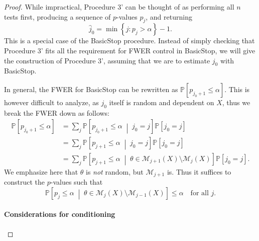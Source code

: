 \documentclass[aos, authoryear]{imsart}
\theoremstyle{definition}
\theoremstyle{custom}
\newcommand{\PP}{\mathbb{P}}
\begin{document}
\begin{proof}
While impractical, Procedure 3' can be thought of as performing all $n$ tests first, producing a sequence of $p$-values $p_j$, and returning
\begin{equation}
\label{eq:basicstop}
\hat{j}_0 = \min\left\{j: p_j > \alpha\right\} - 1.
\end{equation}
This is a special case of the BasicStop procedure. Instead of simply checking that Procedure 3' fits all the requirement for FWER control in BasicStop, we will give the construction of Procedure 3', assuming that we are to estimate $j_0$ with BasicStop.

In general, the FWER for BasicStop can be rewritten as $\PP\left[p_{j_0+1} \le \alpha\right]$. This is however difficult to analyze, as $j_0$ itself is random and dependent on $X$, thus we break the FWER down as follows:
\begin{align*}
\PP\left[p_{j_0+1} \le \alpha\right] & = \sum_j \PP\left[p_{j_0+1} \le \alpha \;\middle|\; j_0 = j\right] \PP\left[j_0 = j\right] \\
& = \sum_j \PP\left[p_{j+1} \le \alpha \;\middle|\; j_0 = j\right] \PP\left[j_0 = j\right] \\
& = \sum_j \PP\left[p_{j+1} \le \alpha \;\middle|\; \theta \in \mathcal{M}_{j+1}\left(X\right) \setminus \mathcal{M}_j\left(X\right)\right] \PP\left[j_0 = j\right].
\end{align*}
We emphasize here that $\theta$ is {\em not} random, but $\mathcal{M}_{j+1}$ is. Thus it suffices to construct the $p$-values such that
\begin{equation}
\label{eq:basicstopreq}
\PP\left[p_j \le \alpha \;\middle|\; \theta \in \mathcal{M}_j\left(X\right) \setminus \mathcal{M}_{j-1}\left(X\right)\right] \le \alpha \quad \text{for all } j.
\end{equation}

\paragraph{Considerations for conditioning}


\end{proof}
\end{document}
